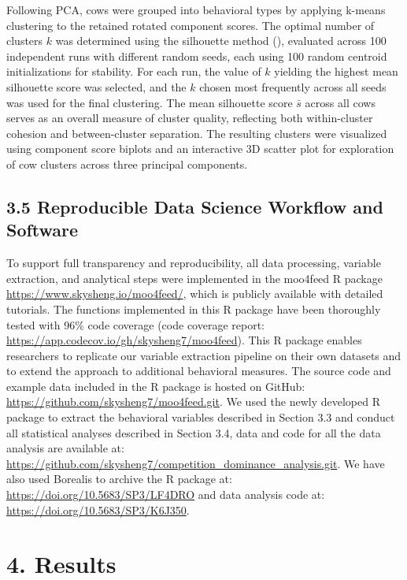 \documentclass[
]{article}
\begin{document}
Following PCA, cows were grouped into behavioral types by applying
k-means clustering to the retained rotated component scores. The optimal
number of clusters \(k\) was determined using the silhouette method
(), evaluated
across 100 independent runs with different random seeds, each using 100
random centroid initializations for stability. For each run, the value
of \(k\) yielding the highest mean silhouette score was selected, and
the \(k\) chosen most frequently across all seeds was used for the final
clustering. The mean silhouette score \(\bar{s}\) across all cows serves
as an overall measure of cluster quality, reflecting both within-cluster
cohesion and between-cluster separation. The resulting clusters were
visualized using component score biplots and an interactive 3D scatter
plot for exploration of cow clusters across three principal components.

\subsection{3.5 Reproducible Data Science Workflow and
Software}\label{reproducible-data-science-workflow-and-software}

To support full transparency and reproducibility, all data processing,
variable extraction, and analytical steps were implemented in the
moo4feed R package \url{https://www.skysheng.io/moo4feed/}, which is
publicly available with detailed tutorials. The functions implemented in
this R package have been thoroughly tested with 96\% code coverage (code
coverage report: \url{https://app.codecov.io/gh/skysheng7/moo4feed}).
This R package enables researchers to replicate our variable extraction
pipeline on their own datasets and to extend the approach to additional
behavioral measures. The source code and example data included in the R
package is hosted on GitHub:
\url{https://github.com/skysheng7/moo4feed.git}. We used the newly
developed R package to extract the behavioral variables described in
Section 3.3 and conduct all statistical analyses described in Section
3.4, data and code for all the data analysis are available at:
\url{https://github.com/skysheng7/competition_dominance_analysis.git}.
We have also used Borealis to archive the R package at:
\url{https://doi.org/10.5683/SP3/LF4DRO} and data analysis code at:
\url{https://doi.org/10.5683/SP3/K6J350}.

\section{4. Results}\label{results}
\end{document}
